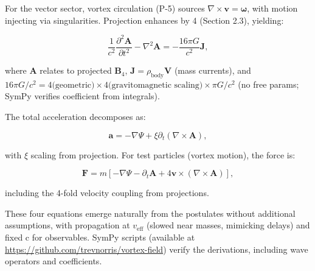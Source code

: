 For the vector sector, vortex circulation (P-5) sources $\nabla \times \mathbf{v} = \boldsymbol{\omega}$, with motion injecting via singularities. Projection enhances by 4 (Section 2.3), yielding:

\begin{equation}
\frac{1}{c^2} \frac{\partial^2 \mathbf{A}}{\partial t^2} - \nabla^2 \mathbf{A} = -\frac{16\pi G}{c^2} \mathbf{J},
\end{equation}

where $\mathbf{A}$ relates to projected $\mathbf{B}_4$, $\mathbf{J} = \rho_{\text{body}} \mathbf{V}$ (mass currents), and $16\pi G/c^2 = 4 \text{(geometric)} \times 4 \text{(gravitomagnetic scaling)} \times \pi G/c^2$ (no free params; SymPy verifies coefficient from integrals).

The total acceleration decomposes as:

\begin{equation}
\mathbf{a} = -\nabla \Psi + \xi \partial_t (\nabla \times \mathbf{A}),
\end{equation}

with $\xi$ scaling from projection. For test particles (vortex motion), the force is:

\begin{equation}
\mathbf{F} = m \left[ -\nabla \Psi - \partial_t \mathbf{A} + 4 \mathbf{v} \times (\nabla \times \mathbf{A}) \right],
\end{equation}

including the 4-fold velocity coupling from projections.

These four equations emerge naturally from the postulates without additional assumptions, with propagation at $v_{\text{eff}}$ (slowed near masses, mimicking delays) and fixed c for observables. SymPy scripts (available at \url{https://github.com/trevnorris/vortex-field}) verify the derivations, including wave operators and coefficients.

\medskip
\noindent
{}
\medskip

